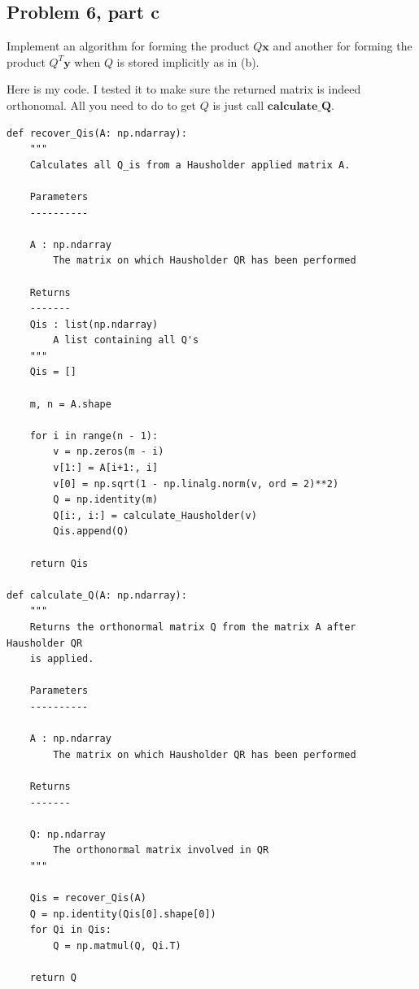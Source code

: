 \subsection{Problem 6, part c}
Implement an algorithm for forming the product $Q\textbf{x}$ and another for forming the product $Q^T\textbf{y}$ when $Q$ is stored implicitly as in (b).
\partbreak
\begin{solution}

    Here is my code. I tested it to make sure the returned matrix is indeed orthonomal. All you need to do to get $Q$ is just call $\textbf{calculate\_Q}$.

\begin{lstlisting}
def recover_Qis(A: np.ndarray):
    """
    Calculates all Q_is from a Hausholder applied matrix A.
    
    Parameters
    ----------
    
    A : np.ndarray
        The matrix on which Hausholder QR has been performed
        
    Returns
    -------
    Qis : list(np.ndarray)
        A list containing all Q's 
    """
    Qis = []
    
    m, n = A.shape
    
    for i in range(n - 1):
        v = np.zeros(m - i)
        v[1:] = A[i+1:, i]
        v[0] = np.sqrt(1 - np.linalg.norm(v, ord = 2)**2)
        Q = np.identity(m)
        Q[i:, i:] = calculate_Hausholder(v)
        Qis.append(Q)
    
    return Qis

def calculate_Q(A: np.ndarray):
    """
    Returns the orthonormal matrix Q from the matrix A after Hausholder QR 
    is applied.
    
    Parameters
    ----------
    
    A : np.ndarray
        The matrix on which Hausholder QR has been performed

    Returns
    -------    
    
    Q: np.ndarray
        The orthonormal matrix involved in QR
    """
    
    Qis = recover_Qis(A)
    Q = np.identity(Qis[0].shape[0])
    for Qi in Qis:
        Q = np.matmul(Q, Qi.T)
        
    return Q
\end{lstlisting}
\end{solution}

\newpage
